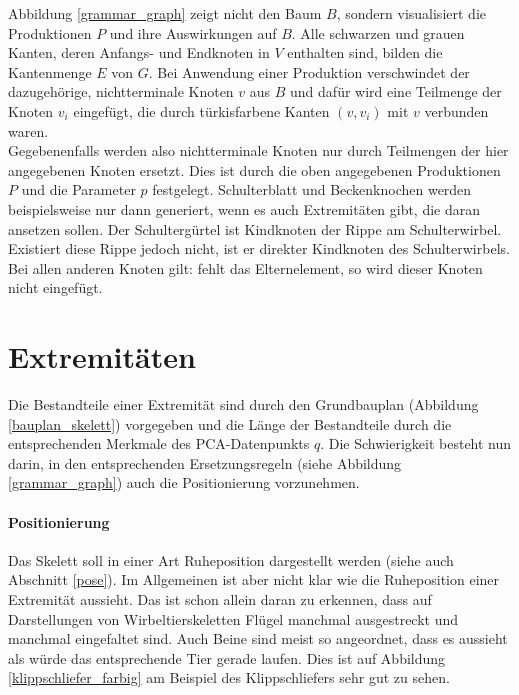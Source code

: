 Abbildung \ref{grammar_graph} zeigt nicht den Baum $B$, sondern visualisiert die Produktionen $P$ und ihre Auswirkungen auf $B$. Alle schwarzen und grauen Kanten, deren Anfangs- und Endknoten in $V$ enthalten sind, bilden die Kantenmenge $E$ von $G$. Bei Anwendung einer Produktion verschwindet der dazugehörige, nichtterminale Knoten $v$ aus $B$ und dafür wird eine Teilmenge der Knoten $v_i$ eingefügt, die durch türkisfarbene Kanten $(v, v_i)$ mit $v$ verbunden waren.\\
Gegebenenfalls werden also nichtterminale Knoten nur durch Teilmengen der hier angegebenen Knoten ersetzt. Dies ist durch die oben angegebenen Produktionen $P$ und die Parameter $p$ festgelegt. Schulterblatt und Beckenknochen werden beispielsweise nur dann generiert, wenn es auch Extremitäten gibt, die daran ansetzen sollen. Der Schultergürtel ist Kindknoten der Rippe am Schulterwirbel. Existiert diese Rippe jedoch nicht, ist er direkter Kindknoten des Schulterwirbels. Bei allen anderen Knoten gilt: fehlt das Elternelement, so wird dieser Knoten nicht eingefügt.


\section{Extremitäten}
\label{section:extremity_generation}

Die Bestandteile einer Extremität sind durch den Grundbauplan (Abbildung \ref{bauplan_skelett}) vorgegeben und die Länge der Bestandteile durch die entsprechenden Merkmale des PCA-Datenpunkts $q$. Die Schwierigkeit besteht nun darin, in den entsprechenden Ersetzungsregeln (siehe Abbildung \ref{grammar_graph}) auch die Positionierung vorzunehmen.

\paragraph{Positionierung}
Das Skelett soll in einer Art Ruheposition dargestellt werden (siehe auch Abschnitt \ref{pose}). Im Allgemeinen ist aber nicht klar wie die Ruheposition einer Extremität aussieht. Das ist schon allein daran zu erkennen, dass auf Darstellungen von Wirbeltierskeletten Flügel manchmal ausgestreckt und manchmal eingefaltet sind. Auch Beine sind meist so angeordnet, dass es aussieht als würde das entsprechende Tier gerade laufen. Dies ist auf Abbildung \ref{klippschliefer_farbig} am Beispiel des Klippschliefers sehr gut zu sehen.

